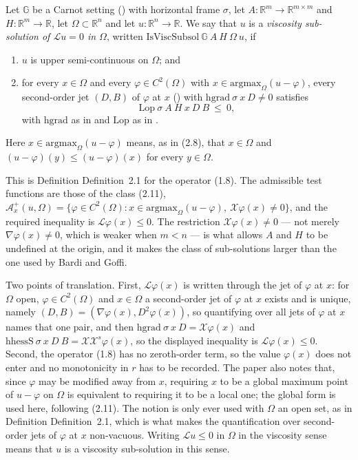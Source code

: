 \begin{definition}
Let $\mathbb G$ be a Carnot setting () with horizontal frame
$\sigma$, let $A:\mathbb R^m\to\mathbb R^{m\times m}$ and $H:\mathbb R^m\to\mathbb R$, let
$\Omega\subset\mathbb R^n$ and let $u:\mathbb R^n\to\mathbb R$. We say that $u$ is a
\emph{viscosity sub-solution of $\mathcal Lu=0$ in $\Omega$}, written
$\mathrm{IsViscSubsol}\ \mathbb G\ A\ H\ \Omega\ u$, if
\begin{enumerate}
\item $u$ is upper semi-continuous on $\Omega$; and
\item for every $x\in\Omega$ and every $\varphi\in C^{2}(\Omega)$ with
  $x\in\mathrm{argmax}_\Omega(u-\varphi)$, every second-order jet $(D,B)$ of $\varphi$ at
  $x$ () with $\mathrm{hgrad}\ \sigma\ x\ D\neq0$ satisfies
  \[
   \mathrm{Lop}\ \sigma\ A\ H\ x\ D\ B\ \le\ 0 ,
  \]
  with $\mathrm{hgrad}$ as in  and $\mathrm{Lop}$ as in .
\end{enumerate}
Here $x\in\mathrm{argmax}_\Omega(u-\varphi)$ means, as in (2.8), that $x\in\Omega$
and $(u-\varphi)(y)\le(u-\varphi)(x)$ for every $y\in\Omega$.

This is Definition Definition~2.1 for the operator (1.8). The admissible test functions are
those of the class (2.11), $\mathcal A^{+}_x(u,\Omega)=\{\varphi\in C^2(\Omega):
x\in\mathrm{argmax}_\Omega(u-\varphi),\ \mathcal X\varphi(x)\neq0\}$, and the required
inequality is $\mathcal L\varphi(x)\le0$. The restriction
$\mathcal X\varphi(x)\neq0$ --- not merely $\nabla\varphi(x)\neq0$, which is weaker when
$m<n$ --- is what allows $A$ and $H$ to be undefined at the origin, and it makes the class
of sub-solutions larger than the one used by Bardi and Goffi.

Two points of translation. First, $\mathcal L\varphi(x)$ is written through the jet of
$\varphi$ at $x$: for $\Omega$ open, $\varphi\in C^2(\Omega)$ and $x\in\Omega$ a
second-order jet of $\varphi$ at $x$ exists and is unique, namely
$(D,B)=(\nabla\varphi(x),D^2\varphi(x))$, so quantifying over all jets of $\varphi$ at $x$
names that one pair, and then
$\mathrm{hgrad}\ \sigma\ x\ D=\mathcal X\varphi(x)$ and
$\mathrm{hhessS}\ \sigma\ x\ D\ B=\mathcal X\mathcal X^{s}\varphi(x)$, so the displayed
inequality is $\mathcal L\varphi(x)\le0$. Second, the operator (1.8) has no
zeroth-order term, so the value $\varphi(x)$ does not enter and no monotonicity in $r$ has
to be recorded. The paper also notes that, since $\varphi$ may be modified away from $x$,
requiring $x$ to be a global maximum point of $u-\varphi$ on $\Omega$ is equivalent to
requiring it to be a local one; the global form is used here, following (2.11). The notion is only ever used with
$\Omega$ an open set, as in Definition Definition~2.1, which is what makes the quantification
over second-order jets of $\varphi$ at $x$ non-vacuous. Writing
$\mathcal Lu\le0$ in $\Omega$ in the viscosity sense means that $u$ is a viscosity
sub-solution in this sense.
\end{definition}
